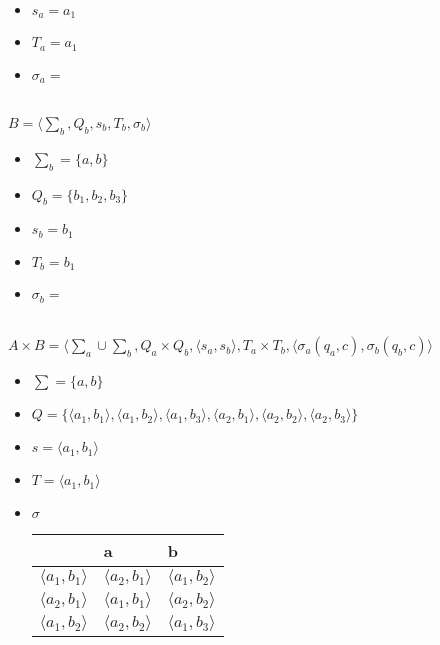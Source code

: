 \documentclass[10pt]{article}
\begin{document}
\begin{enumerate}
\begin{enumerate}[label*=\arabic*.]
\begin{itemize}
			\item $s_a={a_1}$\\
			\item $T_a={a_1}$\\
			\item $\sigma_a=$\\
			\\
		\end{itemize}
		$B=\langle \sum_b, Q_b, s_b, T_b, \sigma_b \rangle$\\
		\begin{itemize}
			\item $\sum_b=\{a,b\}$\\
			\item $Q_b=\{b_1,b_2,b_3\}$\\
			\item $s_b={b_1}$\\
			\item $T_b={b_1}$\\
			\item $\sigma_b=$\\
			\\
		\end{itemize}
		$A\times B=\langle \sum_a\cup\sum_b, Q_a\times Q_b, \langle s_a,s_b\rangle, T_a\times T_b, \langle\sigma_a(q_a,c),\sigma_b(q_b,c) \rangle$
		\begin{itemize}
			\item $\sum=\{a,b\}$\\
			\item $Q=\{\langle a_1,b_1\rangle,\langle a_1,b_2\rangle,\langle a_1,b_3\rangle,\langle a_2,b_1\rangle,\langle a_2,b_2\rangle,\langle a_2,b_3\rangle\}$\\
			\item $s=\langle a_1,b_1\rangle$\\
			\item $T=\langle a_1,b_1\rangle$\\
			\item $\sigma$\\
			\begin{tabular}{ | l | l | l | }
				\hline
				& a & b \\ \hline
				$\langle a_1,b_1\rangle$ & $\langle a_2,b_1\rangle$ & $\langle a_1,b_2\rangle$ \\
				$\langle a_2,b_1\rangle$ & $\langle a_1,b_1\rangle$ & $\langle a_2,b_2\rangle$ \\
				$\langle a_1,b_2\rangle$ & $\langle a_2,b_2\rangle$ & $\langle a_1,b_3\rangle$ \\

\end{tabular}
\end{itemize}
\end{enumerate}
\end{enumerate}
\end{document}
